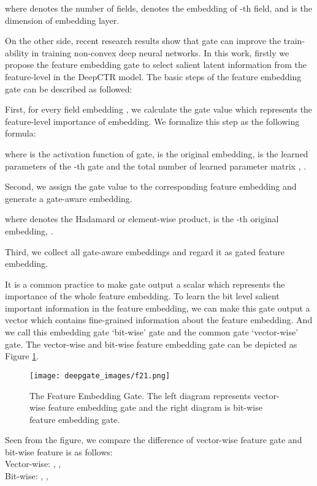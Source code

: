 \documentclass[sigconf,nonacm=true]{acmart}
\begin{document}
where  denotes the number of fields,  denotes the embedding of -th field, and  is the dimension of embedding layer.

On the other side, recent research results show that gate can improve the train-ability in training non-convex deep
neural networks\cite{glorot2010understanding}.
In this work, firstly we propose the feature embedding gate to select salient latent information from the feature-level in the DeepCTR model. 
The basic steps of the feature embedding gate can be described as followed:

First, for every field embedding , we calculate the gate value which represents the feature-level importance of embedding. 
We formalize this step as the following formula: 

where  is the activation function of gate,  is the original embedding,  is the learned parameters of the -th gate and the total number of learned parameter matrix , .

Second, we assign the gate value to the corresponding feature embedding and generate a gate-aware embedding.

where  denotes the Hadamard or element-wise product,  is the -th original embedding, .

Third, we collect all gate-aware embeddings and regard it as gated feature embedding.


It is a common practice to make gate output a scalar which represents the importance of the whole feature embedding.
To learn the bit level salient important information in the feature embedding, we can make this gate output a vector
which contains fine-grained information about the feature embedding.
And we call this embedding gate `bit-wise' gate and the common gate `vector-wise' gate. 
The vector-wise and bit-wise feature embedding gate can be depicted  as Figure \ref{fig:e1}.

\begin{figure}[hbt!]
   \texttt{[image: deepgate\_images/f21.png]}
  \caption{The Feature Embedding Gate. The left diagram represents vector-wise feature embedding gate and the right diagram is bit-wise feature embedding gate.}
  \label{fig:e1}
\end{figure}
Seen from the figure, we compare the difference of vector-wise feature gate and bit-wise feature is as follows:
\\
Vector-wise: , ,  \\
Bit-wise: , , \\
\end{document}
